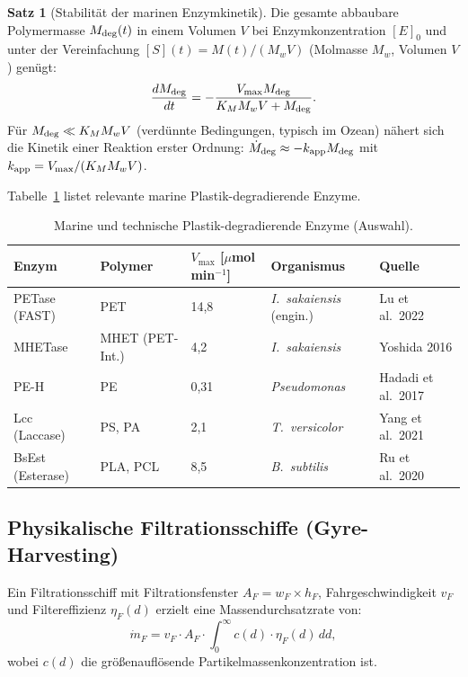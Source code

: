 ﻿\documentclass[12pt,a4paper]{article}
\theoremstyle{definition}
\newtheorem{theorem}{Satz}[section]
\theoremstyle{remark}
\begin{document}
\begin{theorem}[Stabilit\"at der marinen Enzymkinetik]
\label{satz:enzym}
Die gesamte abbaubare Polymermasse $M_{\rm deg}(t)$ in einem Volumen $V$
bei Enzymkonzentration $[E]_0$ und unter der Vereinfachung
$[S](t) = M(t) / (M_w V)$ (Molmasse $M_w$, Volumen $V$) gen\"ugt:
\begin{equation}
  \frac{dM_{\rm deg}}{dt} = -\frac{V_{\max} M_{\rm deg}}{K_M M_w V + M_{\rm deg}}.
  \label{eq:mm_ode}
\end{equation}
F\"ur $M_{\rm deg} \ll K_M M_w V$ (verd\"unnte Bedingungen, typisch im Ozean)
n\"ahert sich die Kinetik einer Reaktion erster Ordnung:
$\dot{M}_{\rm deg} \approx -k_{\rm app} M_{\rm deg}$ mit
$k_{\rm app} = V_{\max} / (K_M M_w V)$.
\end{theorem}

Tabelle~\ref{tab:enzyme} listet relevante marine Plastik-degradierende Enzyme.

\begin{table}[H]
\centering
\caption{Marine und technische Plastik-degradierende Enzyme (Auswahl).}
\label{tab:enzyme}
\begin{tabular}{p{3.5cm} p{2.5cm} p{2.5cm} p{3cm} p{2.5cm}}
\toprule
\textbf{Enzym} & \textbf{Polymer} & $V_{\max}$ [$\mu$mol min$^{-1}$] & \textbf{Organismus} & \textbf{Quelle} \\
\midrule
PETase (FAST) & PET & 14{,}8 & \textit{I.~sakaiensis} (engin.) & Lu et al.\ 2022 \\
MHETase & MHET (PET-Int.) & 4{,}2 & \textit{I.~sakaiensis} & Yoshida 2016 \\
PE-H & PE & 0{,}31 & \textit{Pseudomonas} & Hadadi et al.\ 2017 \\
Lcc (Laccase) & PS, PA & 2{,}1 & \textit{T.~versicolor} & Yang et al.\ 2021 \\
BsEst (Esterase) & PLA, PCL & 8{,}5 & \textit{B.~subtilis} & Ru et al.\ 2020 \\
\bottomrule
\end{tabular}
\end{table}

\subsection{Physikalische Filtrationsschiffe (Gyre-Harvesting)}

Ein Filtrationsschiff mit Filtrationsfenster $A_F = w_F \times h_F$,
Fahrgeschwindigkeit $v_F$ und Filtereffizienz $\eta_F(d)$ erzielt eine
Massendurchsatzrate von:
\begin{equation}
  \dot{m}_F = v_F \cdot A_F \cdot \int_0^\infty c(d) \cdot \eta_F(d)\, dd,
  \label{eq:ship_rate}
\end{equation}
wobei $c(d)$ die gr\"o\ss{}enaufl\"osende Partikelmassenkonzentration ist.
\end{document}
